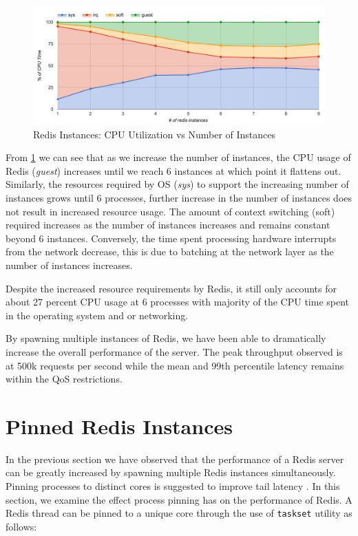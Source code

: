 \begin{figure}[h]
    \includegraphics[width=\textwidth]{./res/6_instances_cpu.png}
    \caption{Redis Instances: CPU Utilization vs Number of Instances}
    \label{fig:6_instances_cpu.png}
\end{figure}

From \ref{fig:6_instances_cpu.png} we can see that as we increase the number of instances, the CPU usage of Redis (\textit{guest}) increases until we reach 6 instances at which point it flattens out. Similarly, the resources required by OS (\textit{sys}) to support the increasing number of instances grows until 6 processes, further increase in the number of instances does not result in increased resource usage. The amount of context switching (soft) required increases as the number of instances increases and remains constant beyond 6 instances. Conversely, the time spent processing hardware interrupts from the network decrease, this is due to batching at the network layer as the number of instances increases.

Despite the increased resource requirements by Redis, it still only accounts for about 27 percent CPU usage at 6 processes with majority of the CPU time spent in the operating system and or networking.


By spawning multiple instances of Redis, we have been able to dramatically increase the overall performance of the server. The peak throughput observed is at 500k requests per second while the mean and 99th percentile latency remains within the QoS restrictions.


\section{Pinned Redis Instances}

In the previous section we have observed that the performance of a Redis server can be greatly increased by spawning multiple Redis instances simultaneously. Pinning processes to distinct cores is suggested to improve tail latency \cite{leverich2014reconciling}. In this section, we examine the effect process pinning has on the performance of Redis. A Redis thread can be pinned to a unique core through the use of \texttt{taskset} utility as follows:

